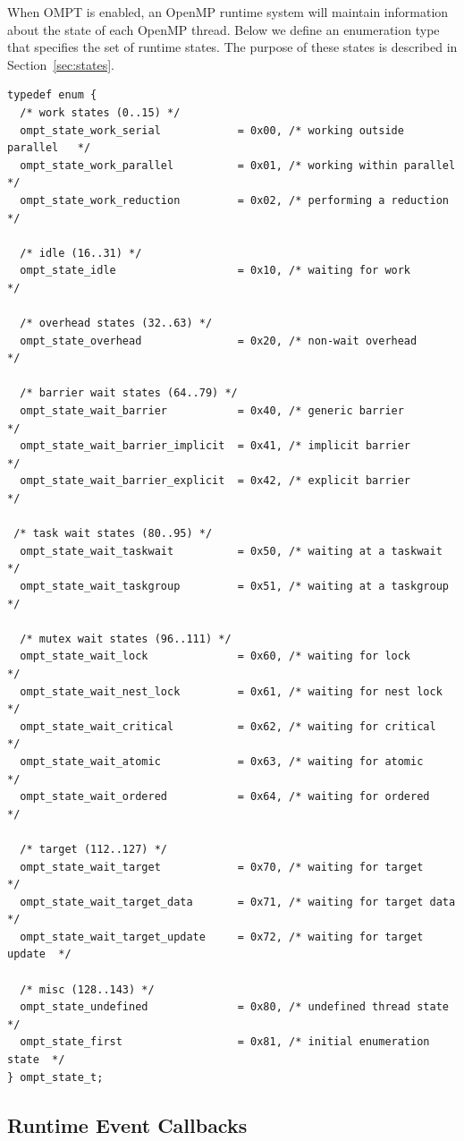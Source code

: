 \documentclass{article}
\begin{document}
{When OMPT is enabled, an OpenMP runtime system will maintain information about the state of  each OpenMP thread. 
Below we define an enumeration type that specifies the set of runtime states. 
The purpose of these states is described in Section~\ref{sec:states}.

\begin{verbatim}
typedef enum {
  /* work states (0..15) */
  ompt_state_work_serial            = 0x00, /* working outside parallel   */
  ompt_state_work_parallel          = 0x01, /* working within parallel    */
  ompt_state_work_reduction         = 0x02, /* performing a reduction     */

  /* idle (16..31) */
  ompt_state_idle                   = 0x10, /* waiting for work           */

  /* overhead states (32..63) */
  ompt_state_overhead               = 0x20, /* non-wait overhead          */

  /* barrier wait states (64..79) */
  ompt_state_wait_barrier           = 0x40, /* generic barrier            */
  ompt_state_wait_barrier_implicit  = 0x41, /* implicit barrier           */
  ompt_state_wait_barrier_explicit  = 0x42, /* explicit barrier           */
    
 /* task wait states (80..95) */
  ompt_state_wait_taskwait          = 0x50, /* waiting at a taskwait      */
  ompt_state_wait_taskgroup         = 0x51, /* waiting at a taskgroup     */
	
  /* mutex wait states (96..111) */	      	    
  ompt_state_wait_lock              = 0x60, /* waiting for lock           */
  ompt_state_wait_nest_lock         = 0x61, /* waiting for nest lock      */
  ompt_state_wait_critical          = 0x62, /* waiting for critical       */
  ompt_state_wait_atomic            = 0x63, /* waiting for atomic         */
  ompt_state_wait_ordered           = 0x64, /* waiting for ordered        */
  
  /* target (112..127) */
  ompt_state_wait_target            = 0x70, /* waiting for target         */ 
  ompt_state_wait_target_data       = 0x71, /* waiting for target data    */ 
  ompt_state_wait_target_update     = 0x72, /* waiting for target update  */ 

  /* misc (128..143) */
  ompt_state_undefined              = 0x80, /* undefined thread state     */
  ompt_state_first                  = 0x81, /* initial enumeration state  */
} ompt_state_t;
\end{verbatim}
\clearpage
\subsection{Runtime Event Callbacks}
\label{appendix:ompt-types:events}

}
\end{document}
